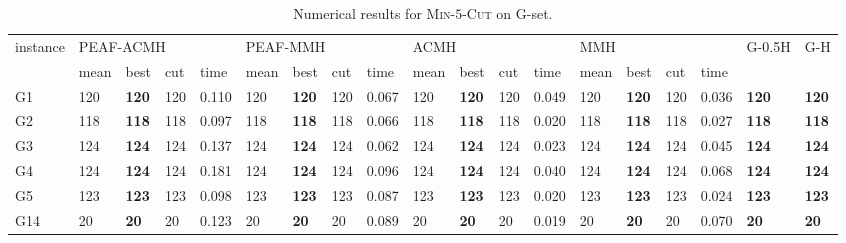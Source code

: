 \documentclass[12pt, a4paper]{article}%
\renewcommand{\arraystretch}{1.3}
\numberwithin{equation}{section}
\theoremstyle{plain}
\begin{document}
			
			{
				\scriptsize
				\setlength{\tabcolsep}{8.5pt}
				\renewcommand{\arraystretch}{1.2}
				\begin{landscape}
					\begin{longtable}{lllllllllllllllllll}
						\caption[Results for \textsc{Min}-$5$-\textsc{Cut}]{Numerical results for \textsc{Min}-$5$-\textsc{Cut} on G-set.}
						\label{tab::min5cut}\\
						\hline
						\multirow{2}{*}{instance} & \multicolumn{4}{l}{PEAF-ACMH}               & \multicolumn{4}{l}{PEAF-MMH}                & \multicolumn{4}{l}{ACMH}                   & \multicolumn{4}{l}{MMH}                    & \multirow{2}{*}{G-0.5H} & \multirow{2}{*}{G-H} \\ \cline{2-17}
						& mean    & best           & cut   & time      & mean    & best           & cut   & time     & mean    & best           & cut   & time      & mean    & best           & cut   & time     &                         &                      \\ \hline
						G1                        & 120  & \textbf{120} & 120 & 0.110  & 120  & \textbf{120} & 120 & 0.067 & 120  & \textbf{120} & 120 & 0.049  & 120  & \textbf{120} & 120 & 0.036 & \textbf{120}            & \textbf{120}         \\
						G2                        & 118  & \textbf{118} & 118 & 0.097  & 118  & \textbf{118} & 118 & 0.066 & 118  & \textbf{118} & 118 & 0.020  & 118  & \textbf{118} & 118 & 0.027 & \textbf{118}            & \textbf{118}         \\
						G3                        & 124  & \textbf{124} & 124 & 0.137  & 124  & \textbf{124} & 124 & 0.062 & 124  & \textbf{124} & 124 & 0.023  & 124  & \textbf{124} & 124 & 0.045 & \textbf{124}            & \textbf{124}         \\
						G4                        & 124  & \textbf{124} & 124 & 0.181  & 124  & \textbf{124} & 124 & 0.096 & 124  & \textbf{124} & 124 & 0.040  & 124  & \textbf{124} & 124 & 0.068 & \textbf{124}            & \textbf{124}         \\
						G5                        & 123  & \textbf{123} & 123 & 0.098  & 123  & \textbf{123} & 123 & 0.087 & 123  & \textbf{123} & 123 & 0.020  & 123  & \textbf{123} & 123 & 0.024 & \textbf{123}            & \textbf{123}         \\
						G14                       & 20   & \textbf{20}  & 20  & 0.123  & 20   & \textbf{20}  & 20  & 0.089 & 20   & \textbf{20}  & 20  & 0.019  & 20   & \textbf{20}  & 20  & 0.070 & \textbf{20}             & \textbf{20}          \\

\end{longtable}
\end{landscape}}
\end{document}
